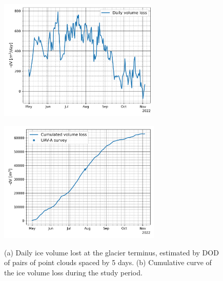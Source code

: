 \begin{figure}
  \centering
  \begin{minipage}[b]{0.45\textwidth}
    \centering
    \includegraphics[height=58mm]{4_delta_volumi_stereo_daily.png}\\
  \end{minipage}
  \hspace{0.05\textwidth}
  \begin{minipage}[b]{0.45\textwidth}
    \centering
    \includegraphics[height=58mm]{4_delta_volumi_stereo_cumlated.png}\\
  \end{minipage}
  \caption{(a) Daily ice volume lost at the glacier terminus, estimated by DOD of pairs
    of point clouds spaced by 5 days. (b) Cumulative curve of the ice volume loss during
    the study period.}
  \label{fig:4:volumes_variation}
\end{figure}

